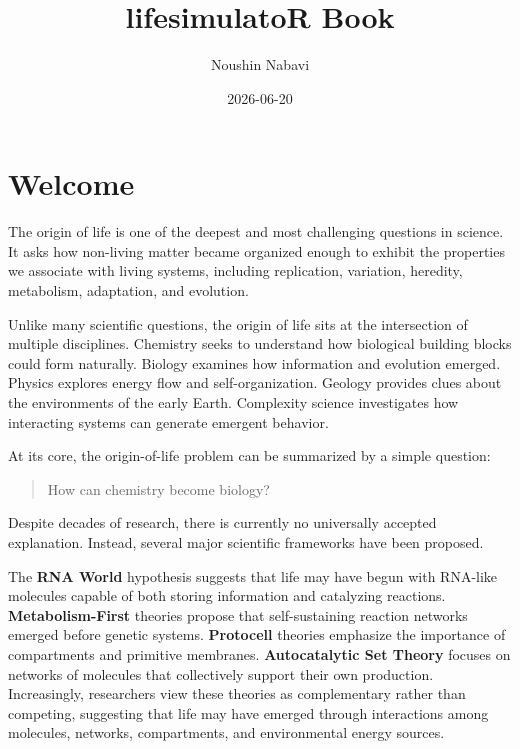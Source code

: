 \documentclass[
  oneside,
  openany]{book}
\title{lifesimulatoR Book}
\author{Noushin Nabavi}
\date{2026-06-20}
\begin{document}
\maketitle

{
\setcounter{tocdepth}{1}
\tableofcontents
}
\href{https://doi.org/10.5281/zenodo.20767188}{}

\chapter*{Welcome}\label{welcome}

The origin of life is one of the deepest and most challenging questions in science. It asks how non-living matter became organized enough to exhibit the properties we associate with living systems, including replication, variation, heredity, metabolism, adaptation, and evolution.

Unlike many scientific questions, the origin of life sits at the intersection of multiple disciplines. Chemistry seeks to understand how biological building blocks could form naturally. Biology examines how information and evolution emerged. Physics explores energy flow and self-organization. Geology provides clues about the environments of the early Earth. Complexity science investigates how interacting systems can generate emergent behavior.

At its core, the origin-of-life problem can be summarized by a simple question:

\begin{quote}
How can chemistry become biology?
\end{quote}

Despite decades of research, there is currently no universally accepted explanation. Instead, several major scientific frameworks have been proposed.

The \textbf{RNA World} hypothesis suggests that life may have begun with RNA-like molecules capable of both storing information and catalyzing reactions. \textbf{Metabolism-First} theories propose that self-sustaining reaction networks emerged before genetic systems. \textbf{Protocell} theories emphasize the importance of compartments and primitive membranes. \textbf{Autocatalytic Set Theory} focuses on networks of molecules that collectively support their own production. Increasingly, researchers view these theories as complementary rather than competing, suggesting that life may have emerged through interactions among molecules, networks, compartments, and environmental energy sources.
\end{document}
